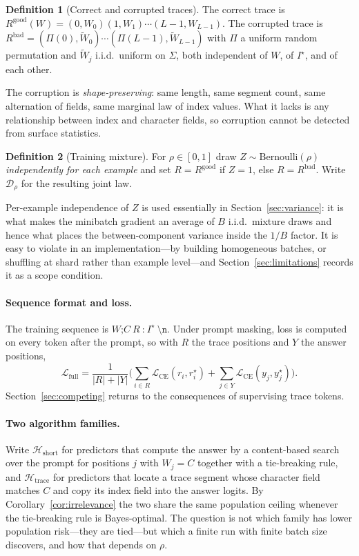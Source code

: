 \documentclass{article}
\theoremstyle{plain}
\theoremstyle{definition}
\newtheorem{definition}{Definition}
\theoremstyle{remark}
\newcommand{\1}{\mathbf{1}}
\newcommand{\cD}{\mathcal{D}}
\newcommand{\cH}{\mathcal{H}}
\newcommand{\cL}{\mathcal{L}}
\newcommand{\good}{\mathrm{good}}
\newcommand{\bad}{\mathrm{bad}}
\begin{document}
\begin{definition}[Correct and corrupted traces]
\label{def:traces}
The correct trace is $R^{\good}(W) = (0,W_0)(1,W_1)\cdots(L-1,W_{L-1})$. The
corrupted trace is
$R^{\bad} = (\Pi(0),\widetilde W_0)\cdots(\Pi(L-1),\widetilde W_{L-1})$ with
$\Pi$ a uniform random permutation and $\widetilde W_j$ i.i.d.\ uniform on
$\Sigma$, both independent of $W$, of $I^\star$, and of each other.
\end{definition}

The corruption is \emph{shape-preserving}: same length, same segment count, same
alternation of fields, same marginal law of index values. What it lacks is any
relationship between index and character fields, so corruption cannot be detected
from surface statistics.

\begin{definition}[Training mixture]
\label{def:mixture}
For $\rho\in[0,1]$ draw $Z\sim\mathrm{Bernoulli}(\rho)$ \emph{independently for
each example} and set $R = R^{\good}$ if $Z = 1$, else $R = R^{\bad}$. Write
$\cD_\rho$ for the resulting joint law.
\end{definition}

Per-example independence of $Z$ is used essentially in
Section~\ref{sec:variance}: it is what makes the minibatch gradient an average of
$B$ i.i.d.\ mixture draws and hence what places the between-component variance
inside the $1/B$ factor. It is easy to violate in an implementation---by building
homogeneous batches, or shuffling at shard rather than example level---and
Section~\ref{sec:limitations} records it as a scope condition.

\paragraph{Sequence format and loss.}
The training sequence is $W\texttt{;}C\ R\ \texttt{:}\ I^\star\
\texttt{\textbackslash n}$. Under prompt masking, loss is computed on every token
after the prompt, so with $R$ the trace positions and $Y$ the answer positions,
\begin{equation}
\label{eq:lfull}
\cL_{\mathrm{full}}
= \frac{1}{|R| + |Y|}\Big(
\sum_{i \in R}\cL_{\mathrm{CE}}(r_i, r_i^\star)
+ \sum_{j \in Y}\cL_{\mathrm{CE}}(y_j, y_j^\star)\Big).
\end{equation}
Section~\ref{sec:competing} returns to the consequences of supervising trace
tokens.

\paragraph{Two algorithm families.}
Write $\cH_{\mathrm{short}}$ for predictors that compute the answer by a
content-based search over the prompt for positions $j$ with $W_j = C$ together
with a tie-breaking rule, and $\cH_{\mathrm{trace}}$ for predictors that locate a
trace segment whose character field matches $C$ and copy its index field into the
answer logits. By Corollary~\ref{cor:irrelevance} the two share the same
population ceiling whenever the tie-breaking rule is Bayes-optimal. The question
is not which family has lower population risk---they are tied---but which a
finite run with finite batch size discovers, and how that depends on $\rho$.
\end{document}

